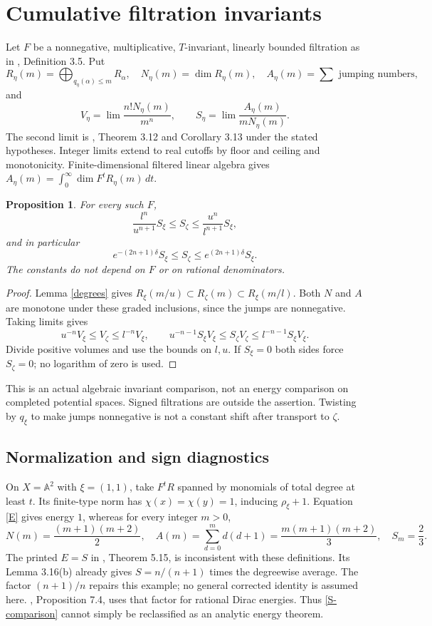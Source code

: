 \documentclass[11pt]{article}
\newtheorem{proposition}[theorem]{Proposition}
\begin{document}
\section{Cumulative filtration invariants}
Let $F$ be a nonnegative, multiplicative, $T$-invariant, linearly bounded filtration as in \cite{YW22}, Definition 3.5.
Put
\[
 R_\eta(m)=\bigoplus_{q_\eta(\alpha)\leq m}R_\alpha,\quad
 N_\eta(m)=\dim R_\eta(m),\quad A_\eta(m)=\sum\text{ jumping numbers},
\]
and
\[
 V_\eta=\lim\frac{n!N_\eta(m)}{m^n},\qquad
 S_\eta=\lim\frac{A_\eta(m)}{mN_\eta(m)}.
\]
The second limit is \cite{YW22}, Theorem 3.12 and Corollary 3.13 under the stated hypotheses.
Integer limits extend to real cutoffs by floor and ceiling and monotonicity.
Finite-dimensional filtered linear algebra gives $A_\eta(m)=\int_0^\infty\dim F^tR_\eta(m)\,dt$.

\begin{proposition}\label{filtration}
For every such $F$,
\[
 \frac{l^n}{u^{n+1}}S_\xi\leq S_\zeta\leq
 \frac{u^n}{l^{n+1}}S_\xi,
\]
and in particular
\begin{equation}\label{S-comparison}
 e^{-(2n+1)\delta}S_\xi\leq S_\zeta\leq e^{(2n+1)\delta}S_\xi.
\end{equation}
The constants do not depend on $F$ or on rational denominators.
\end{proposition}
\begin{proof}
Lemma \ref{degrees} gives $R_\xi(m/u)\subset R_\zeta(m)\subset R_\xi(m/l)$.
Both $N$ and $A$ are monotone under these graded inclusions, since the jumps are nonnegative.
Taking limits gives
\[
 u^{-n}V_\xi\leq V_\zeta\leq l^{-n}V_\xi,\qquad
 u^{-n-1}S_\xi V_\xi\leq S_\zeta V_\zeta\leq l^{-n-1}S_\xi V_\xi.
\]
Divide positive volumes and use the bounds on $l,u$.
If $S_\xi=0$ both sides force $S_\zeta=0$; no logarithm of zero is used.
\end{proof}
This is an actual algebraic invariant comparison, not an energy comparison on completed potential spaces.
Signed filtrations are outside the assertion.
Twisting by $q_\xi$ to make jumps nonnegative is not a constant shift after transport to $\zeta$.

\subsection{Normalization and sign diagnostics}
On $X=\mathbb A^2$ with $\xi=(1,1)$, take $F^tR$ spanned by monomials of total degree at least $t$.
Its finite-type norm has $\chi(x)=\chi(y)=1$, inducing $\rho_\xi+1$.
Equation \eqref{E} gives energy $1$, whereas for every integer $m>0$,
\[
 N(m)=\frac{(m+1)(m+2)}2,\quad
 A(m)=\sum_{d=0}^m d(d+1)=\frac{m(m+1)(m+2)}3,\quad
 S_m=\frac23.
\]
The printed $E=S$ in \cite{YW22}, Theorem 5.15, is inconsistent with these definitions.
Its Lemma 3.16(b) already gives $S=n/(n+1)$ times the degreewise average.
The factor $(n+1)/n$ repairs this example; no general corrected identity is assumed here.
\cite{YW24}, Proposition 7.4, uses that factor for rational Dirac energies.
Thus \eqref{S-comparison} cannot simply be reclassified as an analytic energy theorem.
\end{document}
